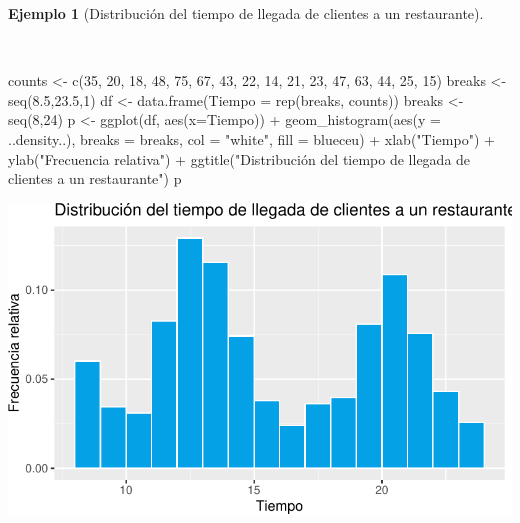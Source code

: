 \documentclass[
  a4paper,
]{scrreport}
\newenvironment{Shaded}{\begin{snugshade}}{\end{snugshade}}
\newcommand{\AttributeTok}[1]{\textcolor[rgb]{0.40,0.45,0.13}{#1}}
\newcommand{\DecValTok}[1]{\textcolor[rgb]{0.68,0.00,0.00}{#1}}
\newcommand{\FloatTok}[1]{\textcolor[rgb]{0.68,0.00,0.00}{#1}}
\newcommand{\FunctionTok}[1]{\textcolor[rgb]{0.28,0.35,0.67}{#1}}
\newcommand{\NormalTok}[1]{\textcolor[rgb]{0.00,0.23,0.31}{#1}}
\newcommand{\OtherTok}[1]{\textcolor[rgb]{0.00,0.23,0.31}{#1}}
\newcommand{\SpecialCharTok}[1]{\textcolor[rgb]{0.37,0.37,0.37}{#1}}
\newcommand{\StringTok}[1]{\textcolor[rgb]{0.13,0.47,0.30}{#1}}
\theoremstyle{plain}
\theoremstyle{definition}
\newtheorem{example}{Ejemplo}[chapter]
\theoremstyle{definition}
\theoremstyle{remark}
\begin{document}
\begin{example}[Distribución del tiempo de llegada de clientes a un
restaurante]\protect\hypertarget{exm-distribucion-llegada-clientes-restaurantes}{}\label{exm-distribucion-llegada-clientes-restaurantes}

~

\begin{Shaded}
\begin{Highlighting}[]
\NormalTok{counts }\OtherTok{\textless{}{-}} \FunctionTok{c}\NormalTok{(}\DecValTok{35}\NormalTok{, }\DecValTok{20}\NormalTok{, }\DecValTok{18}\NormalTok{, }\DecValTok{48}\NormalTok{, }\DecValTok{75}\NormalTok{, }\DecValTok{67}\NormalTok{, }\DecValTok{43}\NormalTok{, }\DecValTok{22}\NormalTok{, }\DecValTok{14}\NormalTok{, }\DecValTok{21}\NormalTok{, }\DecValTok{23}\NormalTok{, }\DecValTok{47}\NormalTok{, }\DecValTok{63}\NormalTok{, }\DecValTok{44}\NormalTok{, }\DecValTok{25}\NormalTok{, }\DecValTok{15}\NormalTok{)}
\NormalTok{breaks }\OtherTok{\textless{}{-}} \FunctionTok{seq}\NormalTok{(}\FloatTok{8.5}\NormalTok{,}\FloatTok{23.5}\NormalTok{,}\DecValTok{1}\NormalTok{)}
\NormalTok{df }\OtherTok{\textless{}{-}} \FunctionTok{data.frame}\NormalTok{(}\AttributeTok{Tiempo =} \FunctionTok{rep}\NormalTok{(breaks, counts))}
\NormalTok{breaks }\OtherTok{\textless{}{-}} \FunctionTok{seq}\NormalTok{(}\DecValTok{8}\NormalTok{,}\DecValTok{24}\NormalTok{)}
\NormalTok{p }\OtherTok{\textless{}{-}} \FunctionTok{ggplot}\NormalTok{(df, }\FunctionTok{aes}\NormalTok{(}\AttributeTok{x=}\NormalTok{Tiempo)) }\SpecialCharTok{+}
    \FunctionTok{geom\_histogram}\NormalTok{(}\FunctionTok{aes}\NormalTok{(}\AttributeTok{y =}\NormalTok{ ..density..), }\AttributeTok{breaks =}\NormalTok{ breaks, }\AttributeTok{col =} \StringTok{"white"}\NormalTok{, }\AttributeTok{fill =}\NormalTok{ blueceu) }\SpecialCharTok{+}
    \FunctionTok{xlab}\NormalTok{(}\StringTok{"Tiempo"}\NormalTok{) }\SpecialCharTok{+}
    \FunctionTok{ylab}\NormalTok{(}\StringTok{"Frecuencia relativa"}\NormalTok{) }\SpecialCharTok{+}
    \FunctionTok{ggtitle}\NormalTok{(}\StringTok{"Distribución del tiempo de llegada de clientes a un restaurante"}\NormalTok{)}
\NormalTok{p}
\end{Highlighting}
\end{Shaded}

\includegraphics{02-estadistica-descriptiva_files/figure-pdf/histograma-tiempo-llegada-restaurante-1.pdf}

\end{example}
\end{document}
